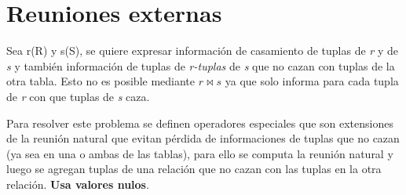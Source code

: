 \documentclass[12pt,a4paper]{report}
\begin{document}
	\section{Reuniones externas}
		\par Sea r(R) y s(S), se quiere expresar información de casamiento de tuplas de \textit{r} y de \textit{s} y también información de tuplas de \textit{r-tuplas} de \textit{s} que no cazan con tuplas de la otra tabla. Esto no es posible mediante $r \bowtie s$ ya que solo informa para cada tupla de \textit{r} con que tuplas de \textit{s} caza.
		\par Para resolver este problema se definen operadores especiales que son extensiones de la reunión natural que evitan pérdida de informaciones de tuplas que no cazan (ya sea en una o ambas de las tablas), para ello se computa la reunión natural y luego se agregan tuplas de una relación que no cazan con las tuplas en la otra relación. \textbf{Usa valores nulos}.
		
\end{document}
